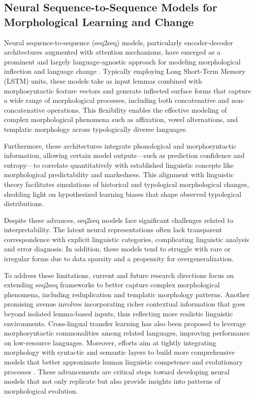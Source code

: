 \documentclass[sigconf]{acmart}
\begin{document}
\subsection{Neural Sequence-to-Sequence Models for Morphological Learning and Change}

Neural sequence-to-sequence (seq2seq) models, particularly encoder-decoder architectures augmented with attention mechanisms, have emerged as a prominent and largely language-agnostic approach for modeling morphological inflection and language change \cite{ref42}. Typically employing Long Short-Term Memory (LSTM) units, these models take as input lemmas combined with morphosyntactic feature vectors and generate inflected surface forms that capture a wide range of morphological processes, including both concatenative and non-concatenative operations. This flexibility enables the effective modeling of complex morphological phenomena such as affixation, vowel alternations, and templatic morphology across typologically diverse languages.

Furthermore, these architectures integrate phonological and morphosyntactic information, allowing certain model outputs—such as prediction confidence and entropy—to correlate quantitatively with established linguistic concepts like morphological predictability and markedness. This alignment with linguistic theory facilitates simulations of historical and typological morphological changes, shedding light on hypothesized learning biases that shape observed typological distributions.

Despite these advances, seq2seq models face significant challenges related to interpretability. The latent neural representations often lack transparent correspondence with explicit linguistic categories, complicating linguistic analysis and error diagnosis. In addition, these models tend to struggle with rare or irregular forms due to data sparsity and a propensity for overgeneralization.

To address these limitations, current and future research directions focus on extending seq2seq frameworks to better capture complex morphological phenomena, including reduplication and templatic morphology patterns. Another promising avenue involves incorporating richer contextual information that goes beyond isolated lemma-based inputs, thus reflecting more realistic linguistic environments. Cross-lingual transfer learning has also been proposed to leverage morphosyntactic commonalities among related languages, improving performance on low-resource languages. Moreover, efforts aim at tightly integrating morphology with syntactic and semantic layers to build more comprehensive models that better approximate human linguistic competence and evolutionary processes \cite{ref42}. These advancements are critical steps toward developing neural models that not only replicate but also provide insights into patterns of morphological evolution.
\end{document}
